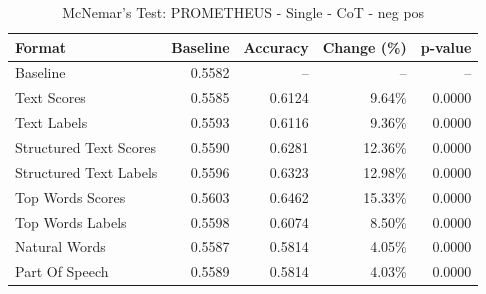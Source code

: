 \begin{table}[htbp]
\centering
\caption{McNemar's Test: PROMETHEUS - Single - CoT - neg pos}
\label{tab:prometheus-single-chain_of_thought_True-neg_pos}
\begin{tabular}{lrrrr}
\toprule
Format & Baseline & Accuracy & Change (\%) & p-value \\
\midrule
Baseline & 0.5582 & -- & -- & -- \\
Text Scores & 0.5585 & 0.6124 & 9.64\% & 0.0000 \\
Text Labels & 0.5593 & 0.6116 & 9.36\% & 0.0000 \\
Structured Text Scores & 0.5590 & 0.6281 & 12.36\% & 0.0000 \\
Structured Text Labels & 0.5596 & 0.6323 & 12.98\% & 0.0000 \\
Top Words Scores & 0.5603 & 0.6462 & 15.33\% & 0.0000 \\
Top Words Labels & 0.5598 & 0.6074 & 8.50\% & 0.0000 \\
Natural Words & 0.5587 & 0.5814 & 4.05\% & 0.0000 \\
Part Of Speech & 0.5589 & 0.5814 & 4.03\% & 0.0000 \\
\bottomrule
\end{tabular}
\end{table}